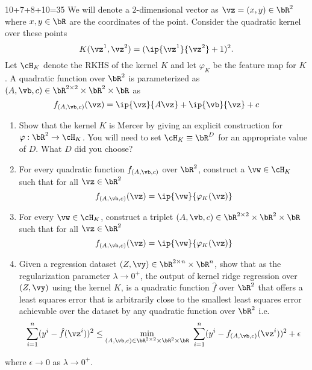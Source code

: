 \documentclass[a4paper,11pt]{article}
\begin{document}
\begin{mlproblem}{10+7+8+10=35}
We will denote a $2$-dimensional vector as $\vz = (x,y) \in \bR^2$ where $x,y\in\bR$ are the coordinates of the point. Consider the quadratic kernel over these points
\[
K(\vz^1,\vz^2) = (\ip{\vz^1}{\vz^2} + 1)^2.
\]
Let $\cH_K$ denote the RKHS of the kernel $K$ and let $\varphi_K$ be the feature map for $K$. A quadratic function over $\bR^2$ is parameterized as $(A,\vb,c) \in \bR^{2\times 2}\times\bR^2\times \bR$ as 
\[
f_{(A,\vb,c)}(\vz) = \ip{\vz}{A\vz} + \ip{\vb}{\vz} + c
\]
\begin{enumerate}
	\item Show that the kernel $K$ is Mercer by giving an explicit construction for $\varphi: \bR^2 \rightarrow \cH_K$. You will need to set $\cH_K \equiv \bR^D$ for an appropriate value of $D$. What $D$ did you choose?
	\item For every quadratic function $f_{(A,\vb,c)}$ over $\bR^2$, construct a $\vw \in \cH_K$ such that for all $\vz \in \bR^2$
	\[
	f_{(A,\vb,c)}(\vz) = \ip{\vw}{\varphi_K(\vz)}
	\]
	\item For every $\vw \in \cH_K$, construct a triplet $(A,\vb,c) \in \bR^{2\times 2}\times\bR^2\times \bR$ such that for all $\vz \in \bR^2$
	\[
		f_{(A,\vb,c)}(\vz) = \ip{\vw}{\varphi_K(\vz)}
	\]
	\item Given a regression dataset $(Z,\vy) \in \bR^{2 \times n} \times \bR^n$, show that as the regularization parameter $\lambda \rightarrow 0^+$, the output of kernel ridge regression over $(Z,\vy)$ using the kernel $K$, is a quadratic function $\hat f$ over $\bR^2$ that offers a least squares error that is arbitrarily close to the smallest least squares error achievable over the dataset by any quadratic function over $\bR^2$ i.e.
	\[
	\sum_{i=1}^n(y^i - \hat f(\vz^i))^2 \leq \min_{(A,\vb,c) \in \bR^{2\times 2}\times\bR^2\times \bR}\ \sum_{i=1}^n(y^i - f_{(A,\vb,c)}(\vz^i))^2 + \epsilon
	\]
\end{enumerate}
where $\epsilon \rightarrow 0$ as $\lambda \rightarrow 0^+$.
\end{mlproblem}
\end{document}
